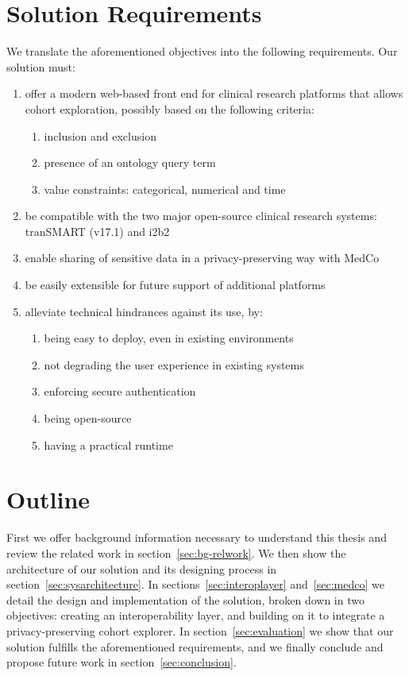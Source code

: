 \newpage
\section{Solution Requirements}
\label{sec:requirements}

We translate the aforementioned objectives into the following requirements.
Our solution must:

\begin{enumerate}
    \item offer a modern web-based front end for clinical research platforms that allows cohort exploration, possibly based on the following criteria:
    \begin{enumerate}
        \item inclusion and exclusion
        \item presence of an ontology query term
        \item value constraints: categorical, numerical and time
    \end{enumerate}
    \item be compatible with the two major open-source clinical research systems: tranSMART (v17.1) and i2b2
    \item enable sharing of sensitive data in a privacy-preserving way with MedCo
    \item be easily extensible for future support of additional platforms
    \item alleviate technical hindrances against its use, by:
    \begin{enumerate}
        \item being easy to deploy, even in existing environments
        \item not degrading the user experience in existing systems
        \item enforcing secure authentication
        \item being open-source
        \item having a practical runtime
    \end{enumerate}
\end{enumerate}



\section{Outline}

First we offer background information necessary to understand this thesis and review the related work in section~\ref{sec:bg-relwork}.
We then show the architecture of our solution and its designing process in  section~\ref{sec:sysarchitecture}.
In sections~\ref{sec:interoplayer} and~\ref{sec:medco} we detail the design and implementation of the solution, broken down in two objectives: creating an interoperability layer, and building on it to integrate a privacy-preserving cohort explorer.
In section~\ref{sec:evaluation} we show that our solution fulfills the aforementioned requirements, and we finally conclude and propose future work in section~\ref{sec:conclusion}.